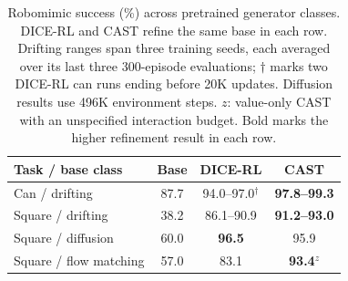 \begin{table}[t]
\centering
\caption{Robomimic success (\%) across pretrained generator classes.
DICE-RL and CAST refine the same base in each row. Drifting ranges span
three training seeds, each averaged over its last three 300-episode
evaluations; $\dagger$ marks two DICE-RL can runs ending before 20K updates.
Diffusion results use 496K environment steps. $z$: value-only CAST with
an unspecified interaction budget. Bold marks the higher refinement
result in each row.}
\label{tab:base-models}
\footnotesize
\setlength{\tabcolsep}{3pt}
\begin{tabular}{@{}lccc@{}}
\toprule
Task / base class & Base & DICE-RL & CAST \\
\midrule
Can / drifting & 87.7 & 94.0--97.0$^{\dagger}$ & \textbf{97.8--99.3} \\
Square / drifting & 38.2 & 86.1--90.9 & \textbf{91.2--93.0} \\
Square / diffusion & 60.0 & \textbf{96.5} & 95.9 \\
Square / flow matching & 57.0 & 83.1 & \textbf{93.4}$^{z}$ \\
\bottomrule
\end{tabular}
\end{table}
